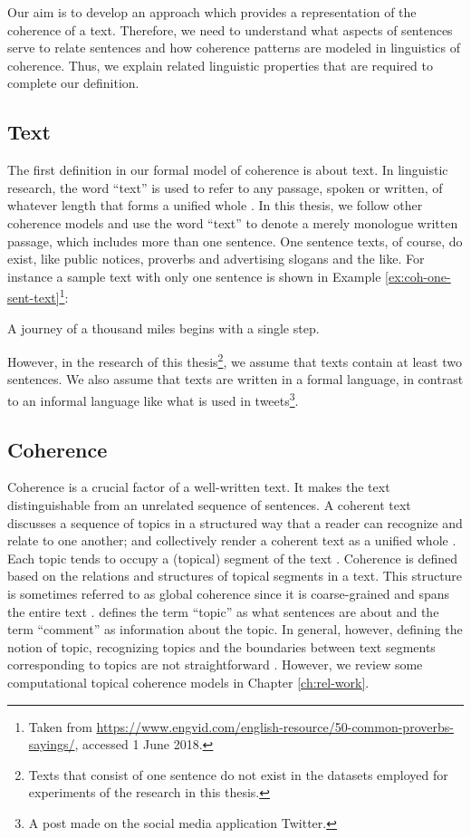 Our aim is to develop an approach which provides a representation of the coherence of a text. 
Therefore, we need to understand what aspects of sentences serve to relate sentences and how coherence patterns are modeled in linguistics of coherence. 
Thus, we explain related linguistic properties that are required to complete our definition. 


\subsection{Text}

The first definition in our formal model of coherence is about text. 
In linguistic research, the word ``text'' is used to refer to any passage, spoken or written, of whatever length that forms a unified whole \cite{halliday76}. 
In this thesis, we follow other coherence models \cite{barzilay08,guinaudeau13} and use the word ``text'' to denote a merely monologue written passage, which includes more than one sentence.
One sentence texts, of course, do exist, like public notices, proverbs and advertising slogans and the like. 
For instance a sample text with only one sentence is shown in Example \ref{ex:coh-one-sent-text}\footnote{Taken from \url{https://www.engvid.com/english-resource/50-common-proverbs-sayings/}, accessed 1 June 2018.}: 

\begin{examples}
    \label{ex:coh-one-sent-text}
    A journey of a thousand miles begins with a single step.
\end{examples}

However, in the research of this thesis\footnote{Texts that consist of one sentence do not exist in the datasets employed for experiments of the research in this thesis.}, we assume that texts contain at least two sentences. 
We also assume that texts are written in a formal language, in contrast to an informal language like what is used in tweets\footnote{A post made on the social media application Twitter.}. 

\subsection{Coherence}

Coherence is a crucial factor of a well-written text. 
It makes the text distinguishable from an unrelated sequence of sentences. 
A coherent text discusses a sequence of topics in a structured way that a reader can recognize and relate to one another; and collectively render a coherent text as a unified whole \cite{stede12}. 
Each topic tends to occupy a (topical) segment of the text \cite{hearst97}. 
Coherence is defined based on the relations and structures of topical segments in a text. 
This structure is sometimes referred to as global coherence since it is coarse-grained and spans the entire text \cite{elsner07}. 
 defines the term ``topic'' as what sentences are about and the term ``comment'' as information about the topic.  
In general, however, defining the notion of topic, recognizing topics and the boundaries between text segments corresponding to topics are not straightforward \cite{stede12}. 
However, we review some computational topical coherence models in Chapter \ref{ch:rel-work}. 


